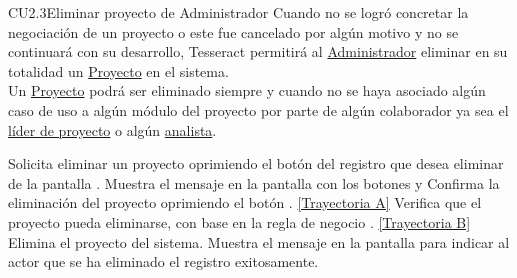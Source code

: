 	\begin{UseCase}{CU2.3}{Eliminar proyecto de Administrador}{
				Cuando no se logró concretar la negociación de un proyecto o este fue cancelado por algún motivo y no se continuará con su desarrollo, Tesseract permitirá al {\hyperlink{admin}{Administrador}} eliminar en su totalidad un \hyperlink{proyectoEntidad}{Proyecto} en el sistema. \\
				Un \hyperlink{proyectoEntidad}{Proyecto} podrá ser eliminado siempre y cuando no se haya asociado algún caso de uso a algún módulo del proyecto por parte de algún colaborador ya sea el {\hyperlink{jefe}{líder de proyecto}} o algún {\hyperlink{analista}{analista}}.
	}
	\end{UseCase}
	\begin{UCtrayectoria}
		\UCpaso[\UCactor] Solicita eliminar un proyecto oprimiendo el botón \eliminar del registro que desea eliminar de la pantalla .
		\UCpaso[\UCsist] Muestra el mensaje  en la pantalla  con los botones  y 
		\UCpaso[\UCsist] Confirma la eliminación del proyecto oprimiendo el botón . \hyperlink{CU2-3:TAA}{[Trayectoria A]}
		\UCpaso[\UCsist] Verifica que el proyecto pueda eliminarse, con base en la regla de negocio . \hyperlink{CU2-3:TAB}{[Trayectoria B]}
		\UCpaso[\UCsist] Elimina el proyecto del sistema.
		\UCpaso[\UCsist] Muestra el mensaje  en la pantalla  para indicar al actor que se ha eliminado el registro exitosamente.
	\end{UCtrayectoria}		
